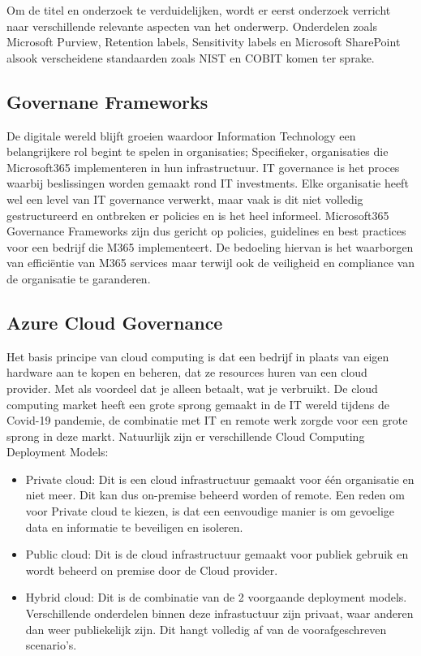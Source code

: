 Om de titel en onderzoek te verduidelijken, wordt er eerst onderzoek verricht naar verschillende relevante aspecten van het onderwerp. Onderdelen zoals Microsoft Purview, Retention labels, Sensitivity labels en Microsoft SharePoint alsook verscheidene standaarden zoals NIST en COBIT komen ter sprake.


\subsection{Governane Frameworks}

De digitale wereld blijft groeien waardoor Information Technology een belangrijkere rol begint te spelen in organisaties; Specifieker, organisaties die Microsoft365 implementeren in hun infrastructuur.
IT governance is het proces waarbij beslissingen worden gemaakt rond IT investments. Elke organisatie heeft wel een level van IT governance verwerkt, maar vaak is dit niet volledig gestructureerd en ontbreken er policies en is het heel informeel. \autocite{Symons2005}
Microsoft365 Governance Frameworks zijn dus gericht op policies, guidelines en best practices voor een bedrijf die M365 implementeert. De bedoeling hiervan is het waarborgen van efficiëntie van M365 services maar terwijl ook de veiligheid en compliance van de organisatie te garanderen.


\subsection{Azure Cloud Governance}

Het basis principe van cloud computing is dat een bedrijf in plaats van eigen hardware aan te kopen en beheren, dat ze resources huren van een cloud provider. Met als voordeel dat je alleen betaalt, wat je verbruikt. \autocite{Mikkola2021}
De cloud computing market heeft een grote sprong gemaakt in de IT wereld tijdens de Covid-19 pandemie, de combinatie met IT en remote werk zorgde voor een grote sprong in deze markt.
Natuurlijk zijn er verschillende Cloud Computing Deployment Models:

\begin{itemize}
    \item Private cloud:
    Dit is een cloud infrastructuur gemaakt voor één organisatie en niet meer. Dit kan dus on-premise beheerd worden of remote.
    Een reden om voor Private cloud te kiezen, is dat een eenvoudige manier is om gevoelige data en informatie te beveiligen en isoleren. \autocite{Mikkola2021}
    \item Public cloud:
    Dit is de cloud infrastructuur gemaakt voor publiek gebruik en wordt beheerd on premise door de Cloud provider.
    \item Hybrid cloud:
    Dit is de combinatie van de 2 voorgaande deployment models. Verschillende onderdelen binnen deze infrastuctuur zijn privaat, waar anderen dan weer publiekelijk zijn. Dit hangt volledig af van de voorafgeschreven scenario's.
\end{itemize}


